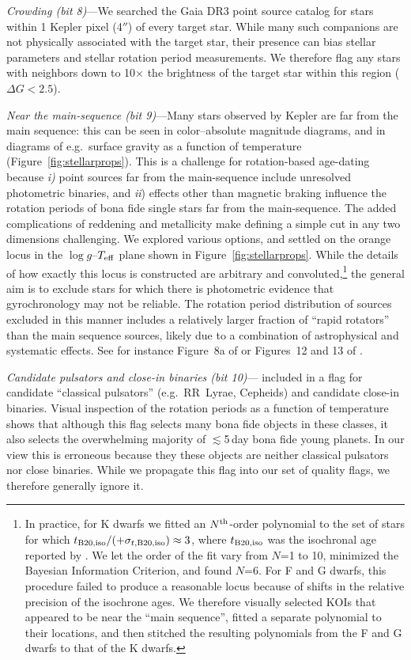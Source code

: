 \documentclass[11pt,twocolumn,tighten]{aastex63}
\begin{document}
{\it Crowding (bit 8)}---We searched the Gaia DR3 point source catalog
for stars within 1 Kepler pixel (4$''$) of every target star.  While
many such companions are not physically associated with the target
star, their presence can bias stellar parameters and stellar rotation
period measurements.  We therefore flag any stars with neighbors down
to 10$\times$ the brightness of the target star within this region
($\Delta G < 2.5$).

{\it Near the main-sequence (bit 9)}---Many stars observed by Kepler
are far from the main sequence: this can be seen in color--absolute
magnitude diagrams, and in diagrams of e.g.~surface gravity as a
function of temperature (Figure~\ref{fig:stellarprops}).  This is a
challenge for rotation-based age-dating because {\it i)} point sources
far from the main-sequence include unresolved photometric binaries,
and {\it ii}) effects other than magnetic braking influence the
rotation periods of bona fide single stars far from the main-sequence.
The added complications of reddening and metallicity make defining a
simple cut in any two dimensions challenging.  
We explored various options, and settled on the orange locus in the
$\log g$--$T_{\rm eff}$ plane shown in Figure~\ref{fig:stellarprops}.
While the details of how exactly this locus is constructed are
arbitrary and convoluted,\footnote{In practice, for K dwarfs we fitted an
$N^{\rm th}$-order polynomial to the set of stars for which $t_{\rm
B20,iso}/(+\sigma_{t,{\rm B20,iso}})\approx 3$, where
$t_{\rm B20,iso}$ was the isochronal age reported by
\citet{Berger_2020a_catalog}. We let the order of the fit vary from
$N$=1 to 10, minimized the Bayesian Information Criterion,
and found $N$=6.  For F and G dwarfs, this procedure failed to produce
a reasonable locus because of shifts in the relative precision of
the isochrone ages.  We therefore visually selected KOIs that appeared
to be near the ``main sequence'', fitted a separate polynomial to
their locations, and then stitched the resulting polynomials from the
F and G dwarfs to that of the K dwarfs.} the general 
aim is to exclude stars for which there is photometric evidence
that gyrochronology may not be reliable.  The rotation period
distribution of sources excluded in this manner includes a relatively
larger fraction of ``rapid rotators'' than the main sequence sources,
likely due to a combination of astrophysical and systematic effects.
See for instance Figure~8a of \citet{2022AJ....164..137K} or Figures~12 and 13
of \citet{2023ApJS..268....4F}.


{\it Candidate pulsators and close-in binaries (bit
10)}---\citeauthor{Santos_2021} included in a flag for candidate
``classical pulsators'' (e.g.\ RR~Lyrae, Cepheids) and candidate
close-in binaries.  Visual inspection of the rotation periods as a
function of temperature shows that although this flag selects many
bona fide objects in these classes, it also selects the overwhelming
majority of $\lesssim$5\,day bona fide young planets.  In our view this is
erroneous because they these objects are neither classical pulsators nor
close binaries.  While we
propagate this flag into our set of quality flags, we therefore
generally ignore it.
\end{document}
